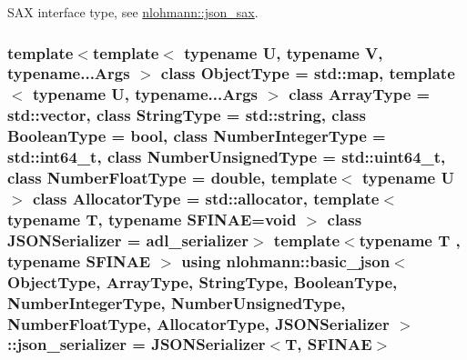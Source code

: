 S\+AX interface type, see \hyperlink{structnlohmann_1_1json__sax}{nlohmann\+::json\+\_\+sax}. 

\subsubsection[{\texorpdfstring{json\+\_\+serializer}{json_serializer}}]{\setlength{\rightskip}{0pt plus 5cm}template$<$template$<$ typename U, typename V, typename...\+Args $>$ class Object\+Type = std\+::map, template$<$ typename U, typename...\+Args $>$ class Array\+Type = std\+::vector, class String\+Type  = std\+::string, class Boolean\+Type  = bool, class Number\+Integer\+Type  = std\+::int64\+\_\+t, class Number\+Unsigned\+Type  = std\+::uint64\+\_\+t, class Number\+Float\+Type  = double, template$<$ typename U $>$ class Allocator\+Type = std\+::allocator, template$<$ typename T, typename S\+F\+I\+N\+A\+E=void $>$ class J\+S\+O\+N\+Serializer = adl\+\_\+serializer$>$ template$<$typename T , typename S\+F\+I\+N\+AE $>$ using {\bf nlohmann\+::basic\+\_\+json}$<$ Object\+Type, Array\+Type, String\+Type, Boolean\+Type, Number\+Integer\+Type, Number\+Unsigned\+Type, Number\+Float\+Type, Allocator\+Type, J\+S\+O\+N\+Serializer $>$\+::{\bf json\+\_\+serializer} =  J\+S\+O\+N\+Serializer$<$T, S\+F\+I\+N\+AE$>$}\hypertarget{classnlohmann_1_1basic__json_a7768841baaaa7a21098a401c932efaff}{}\label{classnlohmann_1_1basic__json_a7768841baaaa7a21098a401c932efaff}
